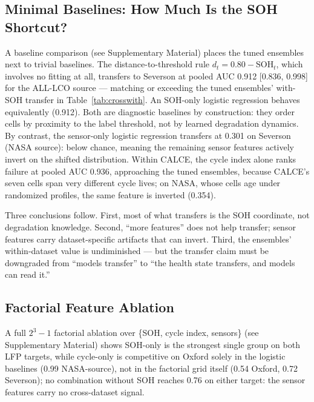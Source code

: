 \documentclass[preprint,12pt]{elsarticle}
\begin{document}
\subsection{Minimal Baselines: How Much Is the SOH Shortcut?}
A baseline comparison (see Supplementary Material) places the tuned ensembles next to trivial baselines. The distance-to-threshold rule $d_t = 0.80 - \mathrm{SOH}_t$, which involves no fitting at all, transfers to Severson at pooled AUC 0.912 [0.836, 0.998] for the ALL-LCO source --- matching or exceeding the tuned ensembles' with-SOH transfer in Table~\ref{tab:crosswith}. An SOH-only logistic regression behaves equivalently (0.912). Both are diagnostic baselines by construction: they order cells by proximity to the label threshold, not by learned degradation dynamics. By contrast, the sensor-only logistic regression transfers at 0.301 on Severson (NASA source): below chance, meaning the remaining sensor features actively invert on the shifted distribution. Within CALCE, the cycle index alone ranks failure at pooled AUC 0.936, approaching the tuned ensembles, because CALCE's seven cells span very different cycle lives; on NASA, whose cells age under randomized profiles, the same feature is inverted (0.354).

Three conclusions follow. First, most of what transfers is the SOH coordinate, not degradation knowledge. Second, ``more features'' does not help transfer; sensor features carry dataset-specific artifacts that can invert. Third, the ensembles' within-dataset value is undiminished --- but the transfer claim must be downgraded from ``models transfer'' to ``the health state transfers, and models can read it.''



\subsection{Factorial Feature Ablation}
A full $2^3-1$ factorial ablation over \{SOH, cycle index, sensors\} (see Supplementary Material) shows SOH-only is the strongest single group on both LFP targets, while cycle-only is competitive on Oxford solely in the logistic baselines (0.99 NASA-source), not in the factorial grid itself (0.54 Oxford, 0.72 Severson); no combination without SOH reaches 0.76 on either target: the sensor features carry no cross-dataset signal.
\end{document}
